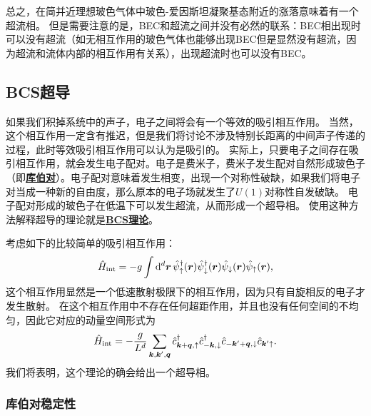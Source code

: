 \documentclass[hyperref, UTF8, a4paper]{ctexart}
\newcommand{\concept}[1]{\underline{\textbf{#1}}}
\begin{document}
总之，在简并近理想玻色气体中玻色-爱因斯坦凝聚基态附近的涨落意味着有一个超流相。
但是需要注意的是，BEC和超流之间并没有必然的联系：BEC相出现时可以没有超流（如无相互作用的玻色气体也能够出现BEC但是显然没有超流，因为超流和流体内部的相互作用有关系），出现超流时也可以没有BEC。

\subsection{BCS超导}

如果我们积掉系统中的声子，电子之间将会有一个等效的吸引相互作用。
当然，这个相互作用一定含有推迟，但是我们将讨论不涉及特别长距离的中间声子传递的过程，此时等效吸引相互作用可以认为是吸引的。
实际上，只要电子之间存在吸引相互作用，就会发生电子配对。电子是费米子，费米子发生配对自然形成玻色子（即\concept{库伯对}）。电子配对意味着发生相变，出现一个对称性破缺，如果我们将电子对当成一种新的自由度，那么原本的电子场就发生了$U(1)$对称性自发破缺。
电子配对形成的玻色子在低温下可以发生超流，从而形成一个超导相。
使用这种方法解释超导的理论就是\concept{BCS理论}。

考虑如下的比较简单的吸引相互作用：
\begin{equation}
    \hat{H}_\text{int} = - g \int \dd[d]{\vb*{r}} \hat{\psi}^\dagger_\uparrow(\vb*{r}) \hat{\psi}^\dagger_{\downarrow}(\vb*{r}) \hat{\psi}_{\downarrow}(\vb*{r}) \hat{\psi}_\uparrow(\vb*{r}),
\end{equation}
这个相互作用显然是一个低速散射极限下的相互作用，因为只有自旋相反的电子才发生散射。
在这个相互作用中不存在任何超距作用，并且也没有任何空间的不均匀，因此它对应的动量空间形式为
\begin{equation}
    \hat{H}_\text{int} = - \frac{g}{L^d} \sum_{\vb*{k}, \vb*{k}', \vb*{q}} \hat{c}^\dagger_{\vb*{k}+\vb*{q}, \uparrow} \hat{c}^\dagger_{-\vb*{k}, \downarrow} \hat{c}_{-\vb*{k}'+\vb*{q}, \downarrow} \hat{c}_{\vb*{k}' \uparrow}.
    \label{eq:bcs-hamiltonian-p}
\end{equation}
我们将表明，这个理论的确会给出一个超导相。

\subsubsection{库伯对稳定性}
\end{document}
